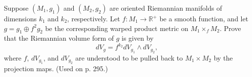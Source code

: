 \begin{exercise}
\label{prob:warped-product-volume-form}
Suppose $(M_1, g_1)$ and $(M_2, g_2)$ are oriented Riemannian manifolds of dimensions $k_1$ and $k_2$, respectively. Let $f : M_1 \to \mathbb{R}^+$ be a smooth function, and let $g = g_1 \oplus f^2 g_2$ be the corresponding warped product metric on $M_1 \times_f M_2$. Prove that the Riemannian volume form of $g$ is given by
\[
dV_g = f^{k_2} dV_{g_1} \wedge dV_{g_2},
\]
where $f$, $dV_{g_1}$, and $dV_{g_2}$ are understood to be pulled back to $M_1 \times M_2$ by the projection maps. (Used on p. 295.)
\end{exercise}
